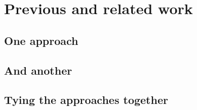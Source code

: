 \section{Previous and related work}


\subsection{One approach}


\subsection{And another}


\subsection{Tying the approaches together}

